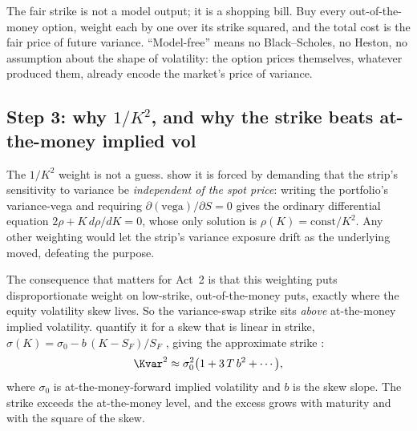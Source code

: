\begin{intuition}
The fair strike is not a model output; it is a shopping bill. Buy every out-of-the-money option, weight each by one over its strike squared, and the total cost is the fair price of future variance. ``Model-free'' means no Black--Scholes, no Heston, no assumption about the shape of volatility: the option prices themselves, whatever produced them, already encode the market's price of variance.
\end{intuition}

\subsection*{Step 3: why $1/K^2$, and why the strike beats at-the-money implied vol}

The $1/K^2$ weight is not a guess. \citet[App.~A, Eq.~A3, p.~38]{Demeterfi1999} show it is forced by demanding that the strip's sensitivity to variance be \emph{independent of the spot price}: writing the portfolio's variance-vega and requiring $\partial(\text{vega})/\partial S = 0$ gives the ordinary differential equation $2\rho + K\,d\rho/dK = 0$, whose only solution is $\rho(K) = \text{const}/K^2$. Any other weighting would let the strip's variance exposure drift as the underlying moved, defeating the purpose.

The consequence that matters for Act~2 is that this weighting puts disproportionate weight on low-strike, out-of-the-money puts, exactly where the equity volatility skew lives. So the variance-swap strike sits \emph{above} at-the-money implied volatility. \citet{Demeterfi1999} quantify it for a skew that is linear in strike, $\sigma(K) = \sigma_0 - b\,(K - S_F)/S_F$ \citep[Eq.~30, p.~23]{Demeterfi1999}, giving the approximate strike \citep[Eq.~31, p.~23]{Demeterfi1999}:
\begin{equation}
\label{eq:gsvivs:skew}
\Kvar^2 \approx \sigma_0^2\big(1 + 3\,T\,b^2 + \cdots\big),
\end{equation}
where $\sigma_0$ is at-the-money-forward implied volatility and $b$ is the skew slope. The strike exceeds the at-the-money level, and the excess grows with maturity and with the square of the skew.

